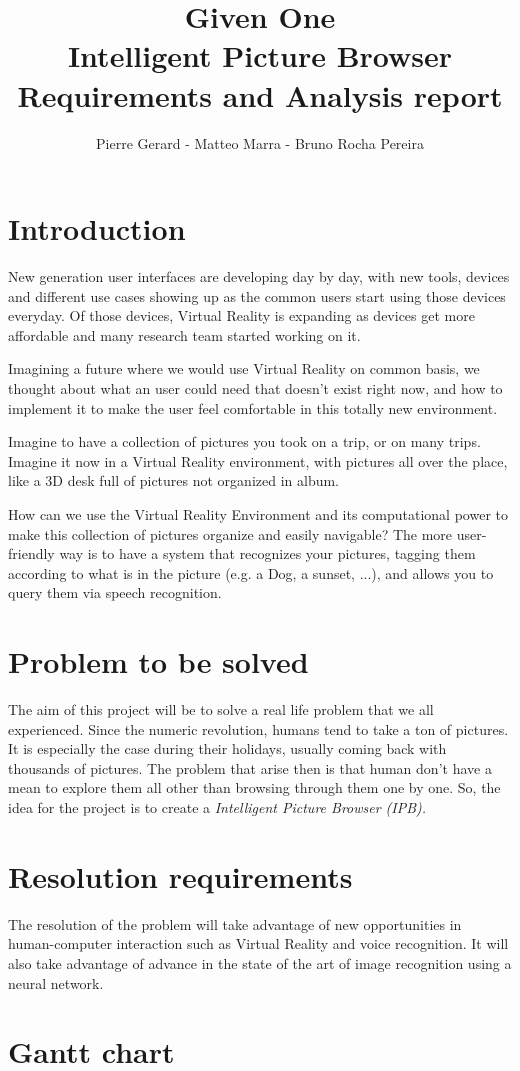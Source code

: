 \documentclass[11pt,a4paper]{article}
\author{Pierre Gerard - Matteo Marra - Bruno Rocha Pereira}
\title{Given One \\ Intelligent Picture Browser \\ Requirements and Analysis report}
\begin{document}
\maketitle

\section{Introduction}
New generation user interfaces are developing day by day, with new tools, devices and different use cases showing up as the common users start using those devices everyday.
Of those devices, Virtual Reality is expanding as devices get more affordable and many research team started working on it. 

Imagining a future where we would use Virtual Reality on common basis, we thought about what an user could need that doesn't exist right now, and how to implement it to make the user feel comfortable in this totally new environment.

Imagine to have a collection of pictures you took on a trip, or on many trips. Imagine it now in a Virtual Reality environment, with pictures all over the place, like a 3D desk full of pictures not organized in album.

How can we use the Virtual Reality Environment and its computational power to make this collection of pictures organize and easily navigable?
The more user-friendly way is to have a system that recognizes your pictures, tagging them according to what is in the picture (e.g. a Dog, a sunset, ...), and allows you to query them via speech recognition.

\section{Problem to be solved}

The aim of this project will be to solve a real life problem that we all experienced. Since the numeric revolution, humans tend to take a ton of pictures. It is especially the case during their holidays, usually coming back with thousands of pictures. The problem that arise then is that human don't have a mean to explore them all other than browsing through them one by one. So, the idea for the project is to create a \textit{Intelligent Picture Browser (IPB).}
 
\section{Resolution requirements}

The resolution of the problem will take advantage of new opportunities in human-computer interaction such as Virtual Reality and voice recognition. It will also take advantage of advance in the state of the art of image recognition using a neural network.

\section{Gantt chart}
\end{document}
